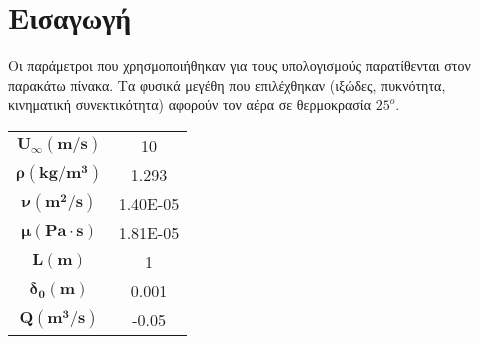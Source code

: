 \section*{Εισαγωγή}

Οι παράμετροι που χρησμοποιήθηκαν για τους υπολογισμούς παρατίθενται στον παρακάτω πίνακα. Τα φυσικά μεγέθη που επιλέχθηκαν (ιξώδες, πυκνότητα, κινηματική συνεκτικότητα) αφορούν τον αέρα σε θερμοκρασία $25^o$.

\begin{table}[!ht]
    \centering
    \begin{tabular}{|c|c|}
    \hline
        $\mathbf{U_{\infty} (m/s)}$ & 10 \\ 
        $\mathbf{\rho (kg/m^3)}$ & 1.293 \\ 
        $\mathbf{\nu (m^2/s)}$ & 1.40E-05 \\ 
        $\mathbf{\mu (Pa\cdot s)}$ & 1.81E-05 \\ 
        $\mathbf{L (m)}$ & 1 \\ 
        $\mathbf{\delta_0(m)}$ & 0.001 \\ 
        $\mathbf{Q (m^3/s)}$ & -0.05 \\ 
    \hline
    \end{tabular}
\end{table}



